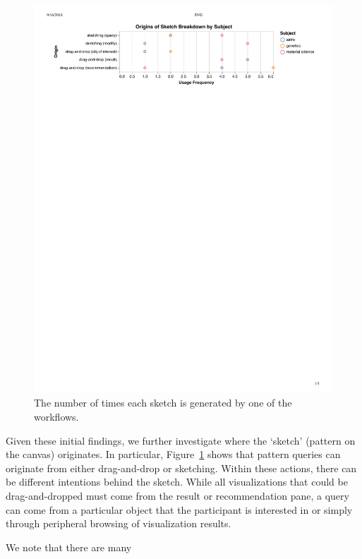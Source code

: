 \begin{figure}[h!]
  \includegraphics[width=\linewidth]{figures/origins_of_sketch_scatter.pdf}
  \caption{The number of times each sketch is generated by one of the workflows.}\label{fig:origins_of_sketch}
\end{figure}
\par Given these initial findings, we further investigate where the `sketch' (pattern on the canvas) originates. In particular, Figure~\ref{fig:origins_of_sketch} shows that pattern queries can originate from either drag-and-drop or sketching. Within these actions, there can be different intentions behind the sketch. While all visualizations that could be drag-and-dropped must come from the result or recommendation pane, a query can come from a particular object that the participant is interested in or simply through peripheral browsing of visualization results.%
\par We note that there are many %
